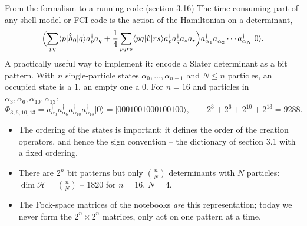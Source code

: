 \documentclass[aspectratio=169,10pt]{beamer}
\newcommand{\ket}[1]{\vert #1\rangle}
\newcommand{\element}[3]{\langle #1\vert #2\vert #3\rangle}
\begin{document}
\begin{frame}{From the formalism to a running code (section 3.16)}
  \vspace{-0.2em}The time-consuming part of any shell-model or FCI code is the action of the Hamiltonian on a determinant,
  \[
    \Bigl(\sum_{pq}\element{p}{\hat{h}_0}{q}a_p^{\dagger}a_q
    +\frac14\sum_{pqrs}\element{pq}{\hat{v}}{rs}a_p^{\dagger}a_q^{\dagger}a_sa_r\Bigr)
    a_{\alpha_1}^{\dagger}a_{\alpha_2}^{\dagger}\cdots a_{\alpha_N}^{\dagger}\ket{0}.
  \]
  A practically useful way to implement it: \alert{encode a Slater determinant as a bit pattern}. With $n$ single-particle states $\alpha_0,\dots,\alpha_{n-1}$ and $N\le n$ particles, an occupied state is a $1$, an empty one a $0$. For $n=16$ and particles in $\alpha_3,\alpha_6,\alpha_{10},\alpha_{13}$:
  \[
    \Phi_{3,6,10,13}=a_{\alpha_3}^{\dagger}a_{\alpha_6}^{\dagger}a_{\alpha_{10}}^{\dagger}a_{\alpha_{13}}^{\dagger}\ket{0}
    =\ket{0001001000100100},
    \qquad 2^3+2^6+2^{10}+2^{13}=9288 .
  \]
  \begin{itemize}
    \item The ordering of the states is important: it defines the order of the creation operators, and hence the sign convention -- the dictionary of section 3.1 with a fixed ordering.
    \item There are $2^n$ bit patterns but only $\binom{n}{N}$ determinants with $N$ particles: $\dim\mathcal{H}=\binom{n}{N}$ -- $1820$ for $n=16$, $N=4$.
    \item The Fock-space matrices of the notebooks \emph{are} this representation; today we never form the $2^n\times2^n$ matrices, only act on one pattern at a time.
  \end{itemize}
\end{frame}
\end{document}
